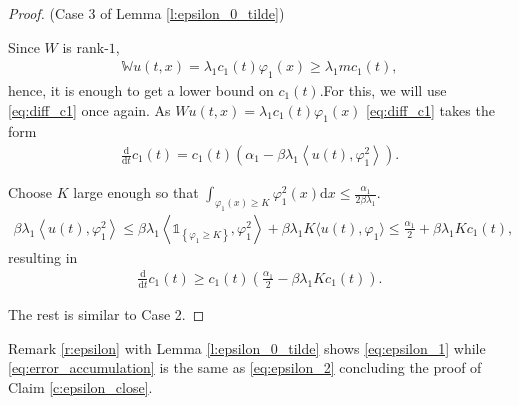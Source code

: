 \documentclass{article}
\renewcommand{\d}{\mathrm{d}}
\newcommand{\W}{\mathbb{W}}
\newcommand{\1}[1]{{\mathds{1}}_{\left\{#1\right\}}}
\begin{document}
\begin{proof}(Case 3 of Lemma \ref{l:epsilon_0_tilde})
	
	Since $W$ is rank-$1$,
	\begin{align*}
		\W u(t,x)=\lambda_1 c_1(t) \varphi_1(x) \geq \lambda_1 m c_1(t),
	\end{align*}
	hence, it is enough to get a lower bound on $c_1(t)$.For this, we will use \eqref{eq:diff_c1} once again. As $Wu(t,x)=\lambda_1 c_1(t) \varphi_1(x)$ \eqref{eq:diff_c1} takes the form
	\begin{align*}
		\frac{\d}{\d t}c_1(t)=c_1(t) \left(\alpha_1-\beta \lambda_1 \left \langle u(t), \varphi_1^2 \right \rangle  \right).
	\end{align*} 
	
	Choose $K$ large enough so that $ \int_{\varphi_1(x) \geq K} \varphi_1^2(x ) \d x \leq \frac{\alpha_1}{2 \beta \lambda_1}.$
	\begin{align*}
		\beta \lambda_1 \left \langle u(t), \varphi_1^2 \right \rangle \leq \beta \lambda_1 \left \langle \1{\varphi_1 \geq K }, \varphi_1^2 \right \rangle +\beta \lambda_1 K \langle u(t), \varphi_1 \rangle  \leq \frac{\alpha_1}{2} +\beta \lambda_1 Kc_1(t),
	\end{align*}
	resulting in
	\begin{align*}
		\frac{\d}{\d t}c_1(t) \geq c_1(t) \left(\frac{\alpha_1}{2}-\beta \lambda_1 K c_1(t)  \right).
	\end{align*}
	
	The rest is similar to Case 2.
\end{proof}

Remark \ref{r:epsilon} with Lemma \ref{l:epsilon_0_tilde} shows \eqref{eq:epsilon_1} while \eqref{eq:error_accumulation} is the same as \eqref{eq:epsilon_2} concluding the proof of Claim \ref{c:epsilon_close}.
\end{document}
